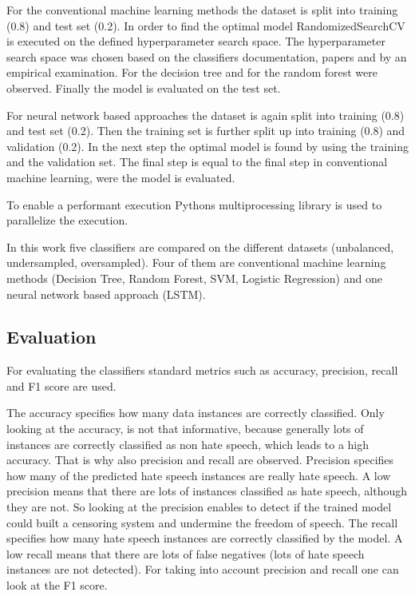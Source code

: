 For the conventional machine learning methods the dataset is split into training (0.8) and test set (0.2). In order to find the optimal model Randomized\-SearchCV is executed on the defined hyperparameter search space. The hyperparameter search space was chosen based on the classifiers doc\-u\-men\-ta\-tion, papers and by an empirical examination. For the decision tree \cite{mantovani2019empirical} and for the random forest \cite{probstHyperparametersTuningStrategies2019} were observed. Finally the model is evaluated on the test set.


For neural network based approaches the dataset is again split into training (0.8) and test set (0.2). Then the training set is further split up into training (0.8) and validation (0.2). In the next step the optimal model is found by using the training and the validation set. The final step is equal to the final step in conventional machine learning, were the model is evaluated.

To enable a performant execution Pythons multiprocessing library is used to parallelize the execution.

In this work five classifiers are compared on the different datasets (unbalanced, undersampled, oversampled). Four of them are conventional machine learning methods (Decision Tree, Random Forest, SVM, Logistic Regression) and one neural network based approach (LSTM).

\subsection{Evaluation}
\label{ch:approachE}

For evaluating the classifiers standard metrics such as accuracy, precision, recall and F1 score are used.

The accuracy specifies how many data instances are correctly classified. Only looking at the accuracy, is not that informative, because generally lots of instances are correctly classified as non hate speech, which leads to a high accuracy. That is why also precision and recall are observed. Precision specifies how many of the predicted hate speech instances are really hate speech. A low precision means that there are lots of instances classified as hate speech, although they are not. So looking at the precision enables to detect if the trained model could built a censoring system and undermine the freedom of speech. The recall specifies how many hate speech instances are correctly classified by the model. A low recall means that there are lots of false negatives (lots of hate speech instances are not detected). For taking into account precision and recall one can look at the F1 score.

